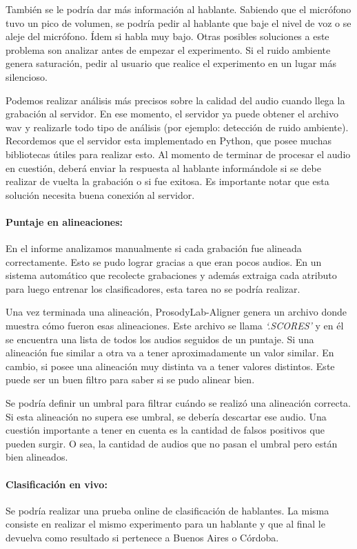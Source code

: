 También se le podría dar más información al hablante. Sabiendo que el micrófono tuvo un pico de volumen, se podría pedir al hablante que baje el nivel de voz o se aleje del micrófono. Ídem si habla muy bajo. Otras posibles soluciones a este problema son analizar antes de empezar el experimento. Si el ruido ambiente genera saturación, pedir al usuario que realice el experimento en un lugar más silencioso. 

Podemos realizar análisis más precisos sobre la calidad del audio cuando llega la grabación al servidor. En ese momento, el servidor ya puede obtener el archivo wav y realizarle todo tipo de análisis (por ejemplo: detección de ruido ambiente). Recordemos que el servidor esta implementado en Python, que posee muchas bibliotecas útiles para realizar esto. Al momento de terminar de procesar el audio en cuestión, deberá enviar la respuesta al hablante informándole si se debe realizar de vuelta la grabación o si fue exitosa. Es importante notar que esta solución necesita buena conexión al servidor. 

\paragraph*{Puntaje en alineaciones:} En el informe analizamos manualmente si cada grabación fue alineada correctamente. Esto se pudo lograr gracias a que eran pocos audios. En un sistema automático que recolecte grabaciones y además extraiga cada atributo para luego entrenar los clasificadores, esta tarea no se podría realizar.     

Una vez terminada una alineación, ProsodyLab-Aligner genera un archivo donde muestra cómo fueron esas alineaciones. Este archivo se llama \textit{`.SCORES’} y en él se encuentra una lista de todos los audios seguidos de un puntaje. Si una alineación fue similar a otra va a tener aproximadamente un valor similar. En cambio, si posee una alineación muy distinta va a tener valores distintos. Este puede ser un buen filtro para saber si se pudo alinear bien.

Se podría definir un umbral para filtrar cuándo se realizó una alineación correcta. Si esta alineación no supera ese umbral, se debería descartar ese audio. Una cuestión importante a tener en cuenta es la cantidad de falsos positivos que pueden surgir. O sea, la cantidad de audios que no pasan el umbral pero están bien alineados.   

\paragraph*{Clasificación en vivo:} Se podría realizar una prueba online de clasificación de hablantes. La misma consiste en realizar el mismo experimento para un hablante y que al final le devuelva como resultado si pertenece a Buenos Aires o Córdoba.

